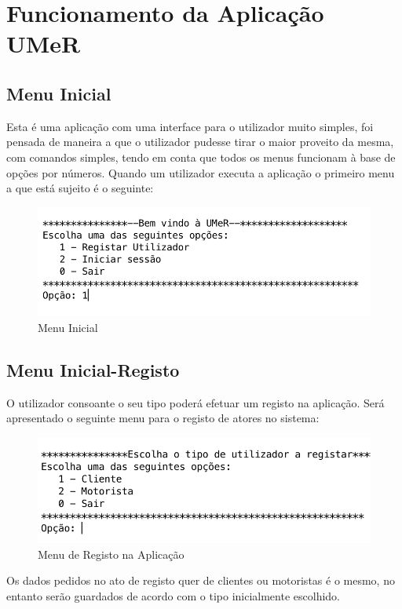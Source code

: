 \chapter{Funcionamento da Aplicação UMeR}
\section{Menu Inicial}
Esta é  uma aplicação com uma interface para o utilizador muito simples, foi pensada
de maneira a que o utilizador pudesse tirar o maior proveito da mesma, com comandos simples, tendo em conta que todos os menus funcionam à base de opções por números.
Quando um utilizador executa a aplicação o primeiro menu a que está sujeito é o
seguinte:

\begin{figure}[htpb]
\centering
\includegraphics[scale=0.6]{imagem/menuInicial}
\caption{Menu Inicial  }
\label{p3:fig:p2_paginicial}
\end{figure}

\section{Menu Inicial-Registo}

O utilizador consoante o seu tipo poderá efetuar um registo na aplicação. Será apresentado o seguinte menu para o registo de atores no sistema: 

\begin{figure}[htpb]
	\centering
	\includegraphics[scale=0.6]{imagem/escolhaTipoAtor}
	\caption{Menu de Registo na Aplicação }
	\label{p3:fig:p2_escolhaTipoAtor}
\end{figure}
Os dados pedidos no ato de registo quer de clientes ou motoristas é o mesmo, no entanto serão guardados de acordo com o tipo inicialmente escolhido. 
\newline

